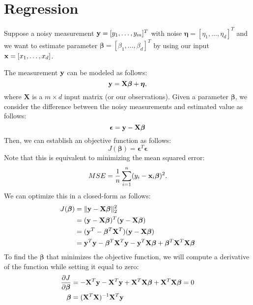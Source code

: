 \section{Regression}
\label{sec:basic_regression}
Suppose a noisy measurement ${\mathbf{y}} = [y_1, \dots, y_m]^T$ with noise $\boldsymbol{\eta} = [\eta_1, \dots, \eta_d]^T$ and we want to estimate parameter $\boldsymbol{\beta} = [\beta_1,\dots,\beta_d]^T$ by using our input ${\mathbf{x}} = [x_1, \dots, x_d]$. 

The measurement ${\mathbf{y}}$ can be modeled as follows:
$${\mathbf{y}} = \mathbf{X}\boldsymbol{\beta}+\boldsymbol{\eta},$$
where $\mathbf{X}$ is a $m\times d$ input matrix (or our observations). Given a parameter $\boldsymbol{\beta}$, we consider the difference between the noisy measurements and estimated value as follows:
$$\boldsymbol{\epsilon} = {\mathbf{y}} - \mathbf{X}\boldsymbol{\beta}$$
Then, we can establish an objective function as follows:
$$J(\boldsymbol{\beta}) = \boldsymbol{\epsilon}^T\boldsymbol{\epsilon}$$
Note that this is equivalent to minimizing the mean squared error:
$$MSE = \frac{1}{n}\sum_{i=1}^n (y_i-{\mathbf{x}}_i\boldsymbol{\beta})^2.$$
We can optimize this in a closed-form as follows:
\begin{align*}
	J(\boldsymbol{\beta}) &= \|\mathbf{y}-\mathbf{X}\boldsymbol{\beta}\|^2_2 \\
			&= (\mathbf{y}-\mathbf{X}\boldsymbol{\beta})^T(\mathbf{y}-\mathbf{X}\boldsymbol{\beta})\\
			&= (\mathbf{y}^T-\boldsymbol{\beta}^T\mathbf{X}^T)(\mathbf{y}-\mathbf{X}\boldsymbol{\beta})\\
			&= {\mathbf{y}}^T{\mathbf{y}}-\boldsymbol{\beta}^T\mathbf{X}^T{\mathbf{y}}-{\mathbf{y}}^T\mathbf{X}\boldsymbol{\beta}+\boldsymbol{\beta}^T\mathbf{X}^T\mathbf{X}\boldsymbol{\beta}
\end{align*}
To find the $\boldsymbol{\beta}$ that minimizes the objective function, we will compute a derivative of the function while setting it equal to zero:
\begin{align*}
	\frac{\partial J}{\partial \boldsymbol{\beta}}&= -\mathbf{X}^T{\mathbf{y}}-\mathbf{X}^T{\mathbf{y}}+\mathbf{X}^T\mathbf{X}\boldsymbol{\beta}+\mathbf{X}^T\mathbf{X}\boldsymbol{\beta} = 0\\
	\boldsymbol{\beta}	&= (\mathbf{X}^T\mathbf{X})^{-1}\mathbf{X}^T{\mathbf{y}}
\end{align*}
